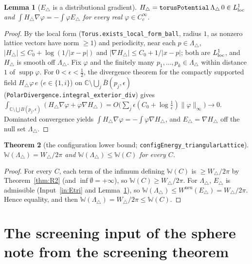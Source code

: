 \documentclass[11pt]{article}
\newtheorem{theorem}{Theorem}[section]
\newtheorem{lemma}[theorem]{Lemma}
\theoremstyle{definition}
\theoremstyle{remark}
\newcommand{\C}{\mathbb C}
\newcommand{\Wneu}{W^{\mathrm{neu}}}
\DeclareMathOperator{\supp}{supp}
\begin{document}
\begin{lemma}[$E_\triangle$ is a distributional gradient]\label{lem:Etrigrad}
$H_\triangle=\texttt{torusPotential}\,\Lambda_\triangle\,0\in L^1_{\rm loc}$ and $\int H_\triangle\nabla\varphi=-\int\varphi E_\triangle$ for every real $\varphi\in C^\infty_c$.
\end{lemma}
\begin{proof}
By the local form (\texttt{Torus.exists\_local\_form\_ball}, radius $1$, as nonzero lattice vectors have norm $\ge1$) and periodicity, near each $p\in\Lambda_\triangle$,
$|H_\triangle|\le C_0+\log(1/|x-p|)$ and $|\nabla H_\triangle|\le C_0+1/|x-p|$; both are $L^1_{\rm loc}$, and $H_\triangle$ is smooth off $\Lambda_\triangle$. Fix $\varphi$ and the finitely many
$p_1,\dots,p_k\in\Lambda_\triangle$ within distance $1$ of $\supp\varphi$. For $0<\epsilon<\frac12$, the divergence theorem for the compactly supported field $H_\triangle\varphi\,e$
($e\in\{1,i\}$) on $\C\setminus\bigcup_j\bar B(p_j,\epsilon)$ (\texttt{PolarDivergence.integral\_exterior\_div}) gives
$\int_{\C\setminus\bigcup B(p_j,\epsilon)}(H_\triangle\nabla\varphi+\varphi\nabla H_\triangle)=O\bigl(\sum_j\epsilon(C_0+\log\frac1\epsilon)\|\varphi\|_\infty\bigr)\to0$. Dominated convergence yields
$\int H_\triangle\nabla\varphi=-\int\varphi\nabla H_\triangle$, and $E_\triangle=\nabla H_\triangle$ off the null set $\Lambda_\triangle$.
\end{proof}

\begin{theorem}[the configuration lower bound; \texttt{configEnergy\_triangularLattice}]\label{thm:R3}
$\mathbb W(\Lambda_\triangle)=W_\triangle/2\pi$ and $\mathbb W(\Lambda_\triangle)\le\mathbb W(C)$ for every $C$.
\end{theorem}
\begin{proof}
For every $C$, each term of the infimum defining $\mathbb W(C)$ is $\ge W_\triangle/2\pi$ by Theorem~\ref{thm:R2} (and $\inf\emptyset=+\infty$), so $\mathbb W(C)\ge W_\triangle/2\pi$. For
$\Lambda_\triangle$, $E_\triangle$ is admissible (Input~\ref{in:Etri} and Lemma~\ref{lem:Etrigrad}), so $\mathbb W(\Lambda_\triangle)\le\Wneu(E_\triangle)=W_\triangle/2\pi$. Hence equality, and then
$\mathbb W(\Lambda_\triangle)=W_\triangle/2\pi\le\mathbb W(C)$.
\end{proof}

\section{The screening input of the sphere note from the screening theorem}\label{sec:sphere}
\end{document}
